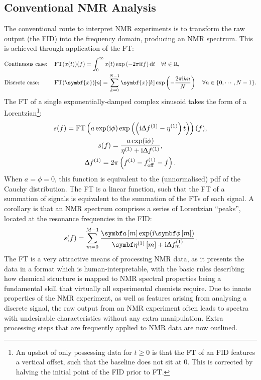 \subsection{Conventional NMR Analysis}
The conventional route to interpret \ac{NMR} experiments is to
transform the raw output (the \ac{FID}) into the frequency domain, producing an
\ac{NMR} spectrum. This is achieved through application of the \acf{FT}:
\begin{subequations}
    \begin{flalign}
        &\text{Continuous case:} &&\FT( x(t) )(f) =  \int_{0}^{\infty} x(t) \exp \left(
            -2 \pi \iu t f \right) \mathrm{d} t
            \quad \forall t \in \mathbb{R},\\
        &\text{Discrete case:} &&\FT( \symbf{x} )[n] =  \sum_{k=0}^{N-1} \symbf{x}[k] \exp \left(
            -\frac{2 \pi \iu k n}{N} \right)
            \quad \forall n \in \lbrace 0, \cdots, N-1 \rbrace.
    \end{flalign}
\end{subequations}
The \ac{FT} of a single exponentially-damped complex sinusoid takes the form of
a Lorentzian\footnote{
    An upshot of only possessing data for $t \geq 0$ is
    that the \ac{FT} of an \ac{FID} features a vertical offset,
    such that the baseline does not sit at 0\cite{Tang1994}. This is corrected
    by halving the initial point of the \ac{FID} prior to \ac{FT}.
}:
\begin{subequations}
    \begin{gather}
        s(f) = \operatorname{FT}\left(
            a \exp(\mathrm{i} \phi) \exp\left(\left(\mathrm{i} \Updelta f^{(1)} - \eta^{(1)}\right) t\right) \right) (f),\\
        s(f) = \frac{a \exp(\mathrm{i} \phi) }
            {\eta^{(1)} + \mathrm{i} \Updelta f^{(1)}},\\
        \Updelta f^{(1)} = 2 \pi \left(f^{(1)} - f_{\mathrm{off}}^{(1)} - f \right).
    \end{gather}
\end{subequations}
When $a = \phi = 0$, this function is equivalent to the (unnormalised) \ac{pdf}
of the Cauchy distribution. The \ac{FT} is a linear function, such that the
\ac{FT} of a summation of signals is equivalent to the summation of the
\acp{FT} of each signal. A corollary is that an \ac{NMR} spectrum comprises a
series of Lorentzian ``peaks'', located at the resonance frequencies in the \ac{FID}:
\begin{equation}
    s(f) = \sum_{m=0}^{M-1}
    \frac{\bdam \exp(\iu \bdphim)}
    {\bdetaonem + \iu \Updelta f^{(1)}_m}.
    \label{eq:ft-summation}
\end{equation}
The \ac{FT} is a very attractive means of processing \ac{NMR} data, as it
presents the data in a format which is human-interpretable, with the basic
rules describing how chemical structure is mapped to \ac{NMR} spectral
properties being a fundamental skill that virtually all experimental chemists
require\cite{Hore2015b}. Due to innate properties of the \ac{NMR} experiment,
as well as features arising from analysing a discrete signal, the raw output
from an \ac{NMR} experiment often leads to spectra with undesirable
characteristics without any extra manipulation. Extra processing
steps that are frequently applied to \ac{NMR} data are now outlined.

